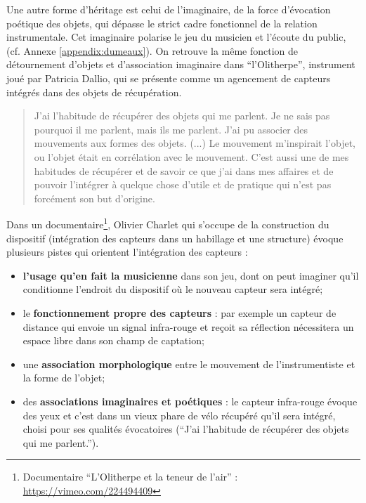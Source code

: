 \noindent Une autre forme d'héritage est celui de l'imaginaire, de la force d'évocation poétique des objets, qui dépasse le strict cadre fonctionnel de la relation instrumentale. Cet imaginaire polarise le jeu du musicien et l'écoute du public,  (cf. Annexe \ref{appendix:dumeaux}). On retrouve la même fonction de détournement d'objets et d'association imaginaire dans ``l'Olitherpe'', instrument joué par Patricia Dallio, qui se présente comme un agencement de capteurs intégrés dans des objets de récupération. 

\begin{quotation}
	J'ai l'habitude de récupérer des objets qui me parlent. Je ne sais pas pourquoi il me parlent, mais ils me parlent. J'ai pu associer des mouvements aux formes des objets. (...) Le mouvement m'inspirait l'objet, ou l'objet était en corrélation avec le mouvement. C'est aussi une de mes habitudes de récupérer et de savoir ce que j'ai dans mes affaires et de pouvoir l'intégrer à quelque chose d'utile et de pratique qui n'est pas forcément son but d'origine.
\end{quotation}

\noindent Dans un documentaire\footnote{Documentaire ``L'Olitherpe et la teneur de l'air'' : \url{https://vimeo.com/224494409}}, Olivier Charlet qui s'occupe de la construction du dispositif (intégration des capteurs dans un habillage et une structure) évoque plusieurs pistes qui orientent l'intégration des capteurs : 
\vspace{-1em}
\begin{itemize}[noitemsep]
\item \textbf{l'usage qu'en fait la musicienne} dans son jeu, dont on peut imaginer qu'il conditionne l'endroit du dispositif où le nouveau capteur sera intégré; 
\item le \textbf{fonctionnement propre des capteurs} : par exemple un capteur de distance qui envoie un signal infra-rouge et reçoit sa réflection nécessitera un espace libre dans son champ de captation;
\item une \textbf{association morphologique} entre le mouvement de l'instrumentiste et la forme de l'objet;
\item des \textbf{associations imaginaires et poétiques} : le capteur infra-rouge évoque des yeux et c'est dans un vieux phare de vélo récupéré qu'il sera intégré, choisi pour ses qualités évocatoires (``J'ai l'habitude de récupérer des objets qui me parlent.'').
\end{itemize}


